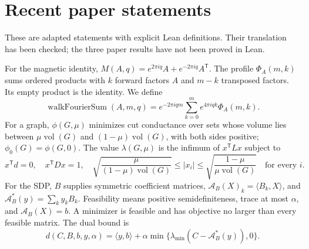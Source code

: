 \documentclass[11pt]{article}
\begin{document}
\par\medskip
\section*{Recent paper statements}
These are adapted statements with explicit Lean definitions. Their translation has been checked; the three paper results have not been proved in Lean.

For the magnetic identity, $M(A,q)=e^{2\pi i q}A+e^{-2\pi i q}A^{\mathsf T}$.
The profile $\Phi_A(m,k)$ sums ordered products with $k$ forward factors $A$ and $m-k$ transposed factors. Its empty product is the identity. We define
\[
\operatorname{walkFourierSum}(A,m,q)=e^{-2\pi i qm}
\sum_{k=0}^m e^{4\pi i qk}\Phi_A(m,k).
\]
For a graph, $\phi(G,\mu)$ minimizes cut conductance over sets whose volume lies between $\mu\operatorname{vol}(G)$ and $(1-\mu)\operatorname{vol}(G)$, with both sides positive; $\phi_0(G)=\phi(G,0)$.
The value $\lambda(G,\mu)$ is the infimum of $x^{\mathsf T}Lx$ subject to
\[
x^{\mathsf T}d=0,\quad x^{\mathsf T}Dx=1,\quad
\sqrt{\frac{\mu}{(1-\mu)\operatorname{vol}(G)}}\leq |x_i|
\leq\sqrt{\frac{1-\mu}{\mu\operatorname{vol}(G)}}\quad\text{for every }i.
\]
For the SDP, $B$ supplies symmetric coefficient matrices,
$\mathcal A_B(X)_k=\langle B_k,X\rangle$, and
$\mathcal A_B^*(y)=\sum_k y_k B_k$.
Feasibility means positive semidefiniteness, trace at most $\alpha$, and $\mathcal A_B(X)=b$.
A minimizer is feasible and has objective no larger than every feasible matrix.
The dual bound is
\[
d(C,B,b,y,\alpha)=\langle y,b\rangle+
\alpha\min\{\lambda_{\min}(C-\mathcal A_B^*(y)),0\}.
\]
\newpage
{}
\end{document}
